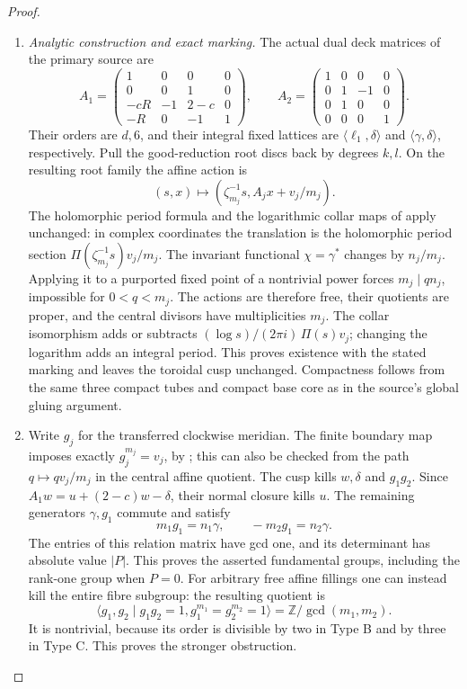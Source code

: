 \begin{proof}
\begin{enumerate}[label=\arabic*.,leftmargin=*]
\item \emph{Analytic construction and exact marking.}
The actual dual deck matrices of the primary source are
\[
 A_1=\begin{pmatrix}
 1&0&0&0\\0&0&1&0\\-cR&-1&2-c&0\\-R&0&-1&1
 \end{pmatrix},\qquad
 A_2=\begin{pmatrix}
 1&0&0&0\\0&1&-1&0\\0&1&0&0\\0&0&0&1
 \end{pmatrix}.
\]
Their orders are $d,6$, and their integral fixed lattices are
$\langle\ell_1,\delta\rangle$ and
$\langle\gamma,\delta\rangle$, respectively.
Pull the good-reduction root discs back by degrees $k,l$.
On the resulting root family the affine action is
\[
 (s,x)\longmapsto(\zeta_{m_j}^{-1}s,A_jx+v_j/m_j).
\]
The holomorphic period formula and the logarithmic collar maps of
\cite[Lemma 4.1, Lemma 4.3]{manYang26} apply unchanged: in complex
coordinates the translation is the holomorphic period section
$\Pi(\zeta_{m_j}^{-1}s)v_j/m_j$.
The invariant functional $\chi=\gamma^*$ changes by $n_j/m_j$.
Applying it to a purported fixed point of a nontrivial power
forces $m_j\mid qn_j$, impossible for $0<q<m_j$.
The actions are therefore free, their quotients are proper, and
the central divisors have multiplicities $m_j$.
The collar isomorphism adds or subtracts
$(\log s)/(2\pi i)\,\Pi(s)v_j$; changing the logarithm adds an
integral period. This proves existence with the stated marking
and leaves the toroidal cusp unchanged. Compactness follows from
the same three compact tubes and compact base core as in the
source's global gluing argument.

\item Write $g_j$ for the transferred clockwise meridian. The finite
boundary map imposes exactly $g_j^{m_j}=v_j$, by
\cite[Proposition 4.4]{manYang26}; this can also be checked from
the path $q\mapsto qv_j/m_j$ in the central affine quotient.
The cusp kills $w,\delta$ and $g_1g_2$.
Since $A_1w=u+(2-c)w-\delta$, their normal closure kills $u$.
The remaining generators $\gamma,g_1$ commute and satisfy
\[
 m_1g_1=n_1\gamma,\qquad -m_2g_1=n_2\gamma.
\]
The entries of this relation matrix have gcd one, and its
determinant has absolute value $|P|$. This proves the asserted
fundamental groups, including the rank-one group when $P=0$.
For arbitrary free affine fillings one can instead kill the
entire fibre subgroup: the resulting quotient is
\[
 \langle g_1,g_2\mid g_1g_2=1,
                  g_1^{m_1}=g_2^{m_2}=1\rangle
 =\mathbb Z/\gcd(m_1,m_2).
\]
It is nontrivial, because its order is divisible by two in Type B
and by three in Type C. This proves the stronger obstruction.


\end{enumerate}
\end{proof}
